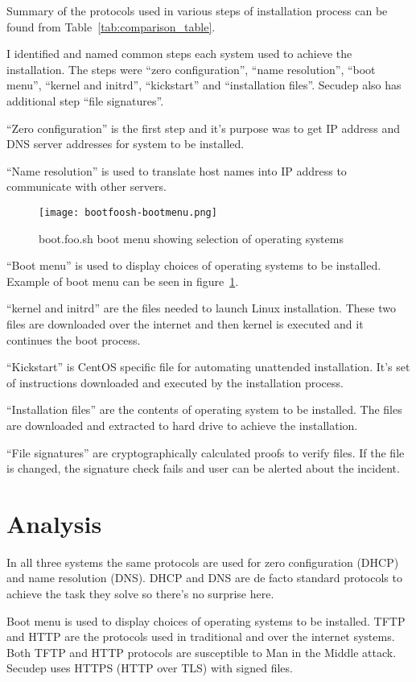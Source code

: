 Summary of the protocols used in various steps of installation process
can be found from Table~\ref{tab:comparison_table}.

I identified and named common steps each system used to achieve the
installation. The steps were ``zero configuration'', ``name
resolution'', ``boot menu'', ``kernel and initrd'', ``kickstart'' and
``installation files''. Secudep also has additional step ``file
signatures''.

``Zero configuration'' is the first step and it's purpose was to get
IP address and DNS server addresses for system to be installed.

``Name resolution'' is used to translate host names into IP address to
communicate with other servers.

\begin{figure}[h]
\label{fig:bootmenu}
\texttt{[image: bootfoosh-bootmenu.png]}
\caption{boot.foo.sh boot menu showing selection of operating systems}
\end{figure}

``Boot menu'' is used to display choices of operating systems to be
installed. Example of boot menu can be seen in figure~\ref{fig:bootmenu}.

``kernel and initrd'' are the files needed to launch Linux
installation. These two files are downloaded over the internet and
then kernel is executed and it continues the boot process.

``Kickstart'' is CentOS specific file for automating unattended
installation. It's set of instructions downloaded and executed by the
installation process.

``Installation files'' are the contents of operating system to be
installed. The files are downloaded and extracted to hard drive to
achieve the installation.

``File signatures'' are cryptographically calculated proofs to verify
files. If the file is changed, the signature check fails and user can
be alerted about the incident.

\section{Analysis}

In all three systems the same protocols are used for zero
configuration (DHCP) and name resolution (DNS). DHCP and DNS are de
facto standard protocols to achieve the task they solve so there's no
surprise here.

Boot menu is used to display choices of operating systems to be
installed. TFTP and HTTP are the protocols used in traditional and
over the internet systems. Both TFTP and HTTP protocols are
susceptible to Man in the Middle attack. Secudep uses HTTPS (HTTP over
TLS) with signed files.

